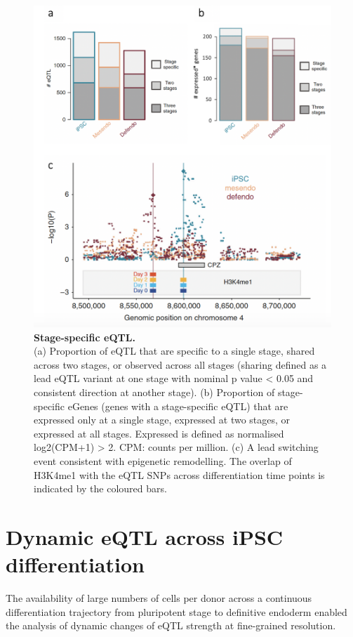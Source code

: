 \begin{figure}[htbp]
\centering
\includegraphics[width=12cm]{Chapter4/Fig/endodiff_stage_specific.png}
\caption[Stage-specific eQTL]{\textbf{Stage-specific eQTL.}\\
(a) Proportion of eQTL that are specific to a single stage, shared across two
stages, or observed across all stages (sharing defined as a lead eQTL variant at one stage with nominal p value < 0.05 and consistent direction
at another stage).
(b) Proportion of stage-specific eGenes (genes with a stage-specific eQTL) that are expressed only at a single stage, expressed at two stages, or expressed at all stages. 
Expressed is defined as normalised log2(CPM+1) > 2. 
CPM: counts per million.
(c) A lead switching event consistent with epigenetic remodelling. 
The overlap of H3K4me1 with the eQTL SNPs across differentiation time points is indicated by the coloured bars.}
\label{fig:endodiff_stage_specific_eqtl}
\end{figure}

\newpage

\section{Dynamic eQTL across iPSC differentiation}

The availability of large numbers of cells per donor across a continuous differentiation trajectory from pluripotent stage to definitive endoderm enabled the analysis of dynamic changes of eQTL strength at fine-grained resolution. 

